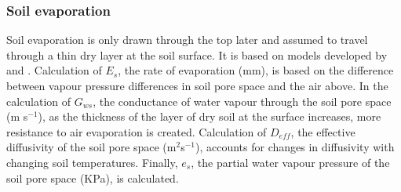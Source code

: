 \documentclass[preprint,12pt,authoryear]{elsarticle}
\begin{document}
%
%
%
%


\subsubsection{Soil evaporation}\label{sec:soilevaporation}

Soil evaporation is only drawn through the top later and assumed to travel through a thin dry layer at the soil surface. It is based on models developed by \cite{Choudhury1988} and \cite{Williams2001}. Calculation of $E_{s}$, the rate of evaporation (mm), is based on the difference between vapour pressure differences in soil pore space and the air above. In the calculation of $G_{ws}$, the conductance of water vapour through the soil pore space (m s$^{-1}$), as the thickness of the layer of dry soil at the surface increases, more resistance to air evaporation is created. Calculation of $D_{eff}$, the effective diffusivity of the soil pore space (m$^{2}$s$^{-1}$), accounts for changes in diffusivity with changing soil temperatures. Finally, $e_{s}$, the partial water vapour pressure of the soil pore space (KPa), is calculated. 
\end{document}
